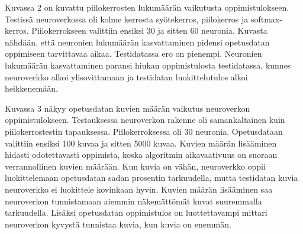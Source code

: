 \documentclass[12pt]{article}
\begin{document}
\begin{figure}
  \caption{}
\end{figure}

Kuvassa 2 on kuvattu piilokerrosten lukumäärän vaikutusta oppimistulokseen. Testissä neuroverkossa oli kolme kerrosta syötekerros, piilokerros ja softmax-kerros. Piilokerrokseen valittiin ensiksi 30 ja sitten 60 neuronia. Kuvasta nähdään, että neuronien lukumäärän kasvattaminen pidensi opetusdatan oppimiseen tarvittavaa aikaa. Testidatassa ero on pienempi. Neuronien lukumäärän kasvattaminen paransi hiukan oppimistulosta testidatassa, kunnes neuroverkko alkoi ylisovittamaan ja testidatan luokittelutulos alkoi heikkenemään.  

Kuvassa 3 näkyy opetusdatan kuvien määrän vaikutus neuroverkon oppimistulokseen. Testauksessa neuroverkon rakenne oli samankaltainen kuin piilokerrostestin tapauksessa. Piilokerroksessa oli 30 neuronia. Opetusdataan valittiin ensiksi 100 kuvaa ja sitten 5000 kuvaa. Kuvien määrän lisääminen hidasti odotettavasti oppimista, koska algoritmin aikavaativuus on suoraan verrannollinen kuvien määrään. Kun kuvia on vähän, neuroverkko oppii luokittelemaan opetusdatan sadan prosentin tarkuudella, mutta testidatan kuvia neuroverkko ei luokittele kovinkaan hyvin. Kuvien määrän lisääminen saa neuroverkon tunnistamaan aiemmin näkemättömät kuvat suuremmalla tarkuudella. Lisäksi opetusdatan oppimistulos on luottettavampi mittari neuroverkon kyvystä tunnistaa kuvia, kun kuvia on enemmän.

\begin{figure}
  \caption{}
\end{figure}
\end{document}
